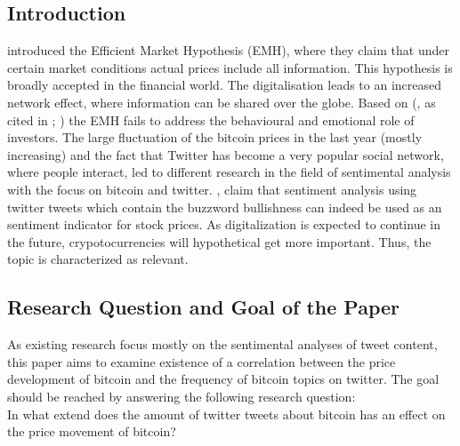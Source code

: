 \documentclass[a4paper,american,12pt]{article}
\begin{document}
\begin{spacing}{1.2}
\cleardoublepage{}
\section{Introduction}
\label{sec:intro}
\textcite[p.~388]{malkiel1970efficient} introduced the Efficient Market Hypothesis (EMH), where they claim that under certain market conditions actual prices include all information. This hypothesis is broadly accepted in the financial world. The digitalisation leads to an increased network effect, where information can be shared over the globe. Based on \citeauthor{mao2015quantifying} (\citeyear[][p.~3]{mao2015quantifying}, as cited in \cite[][pp.~175--195]{shiller2015irrational}; \cite[][pp.~279]{kahneman2013prospect}) the EMH fails to address the behavioural and emotional role of investors. The large fluctuation of the bitcoin prices in the last year (mostly increasing) and the fact that Twitter has become a very popular social network, where people interact, led to different research in the field of sentimental analysis with the focus on bitcoin and twitter. \textcite[p.~18]{mao2015quantifying}, claim that sentiment analysis using twitter tweets which contain the buzzword bullishness can indeed be used as an sentiment indicator for stock prices. As digitalization is expected to continue in the future, crypotocurrencies will hypothetical get more important. Thus, the topic is characterized as relevant.

\subsection{Research Question and Goal of the Paper}
\label{sec:ResearchQandGoal}

As existing research focus mostly on the sentimental analyses of tweet content, this paper aims to examine existence of a correlation between the price development of bitcoin and the frequency of bitcoin topics on twitter. The goal should be reached by answering the following research question: \\
In what extend does the amount of twitter tweets about bitcoin has an effect on the price movement of bitcoin?


\end{spacing}
\end{document}
